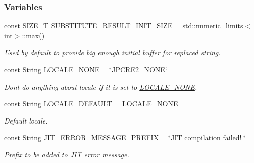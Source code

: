 \subsubsection*{Variables}
\begin{DoxyCompactItemize}
\item 
const \hyperlink{namespacejpcre2_a2aac465ddcb123560c7c8215dd69246c}{S\+I\+Z\+E\+\_\+T} \hyperlink{namespacejpcre2_a80cb201f2e733137b22a8ed98465096a}{S\+U\+B\+S\+T\+I\+T\+U\+T\+E\+\_\+\+R\+E\+S\+U\+L\+T\+\_\+\+I\+N\+I\+T\+\_\+\+S\+I\+ZE} = std\+::numeric\+\_\+limits$<$int$>$\+::max()
\begin{DoxyCompactList}\small\item\em Used by default to provide big enough initial buffer for replaced string. \end{DoxyCompactList}\item 
const \hyperlink{namespacejpcre2_a91f03070152fb228bc116c5a737f1d16}{String} \hyperlink{namespacejpcre2_ad2236dcdcc14d580724b256ce7f168e5}{L\+O\+C\+A\+L\+E\+\_\+\+N\+O\+NE} = \char`\"{}J\+P\+C\+R\+E2\+\_\+\+N\+O\+NE\char`\"{}
\begin{DoxyCompactList}\small\item\em Don\textquotesingle{}t do anything about locale if it is set to \hyperlink{namespacejpcre2_ad2236dcdcc14d580724b256ce7f168e5}{L\+O\+C\+A\+L\+E\+\_\+\+N\+O\+NE}. \end{DoxyCompactList}\item 
const \hyperlink{namespacejpcre2_a91f03070152fb228bc116c5a737f1d16}{String} \hyperlink{namespacejpcre2_adfdd3d1fff99e685734ae4e59771e84d}{L\+O\+C\+A\+L\+E\+\_\+\+D\+E\+F\+A\+U\+LT} = \hyperlink{namespacejpcre2_ad2236dcdcc14d580724b256ce7f168e5}{L\+O\+C\+A\+L\+E\+\_\+\+N\+O\+NE}
\begin{DoxyCompactList}\small\item\em Default locale. \end{DoxyCompactList}\item 
const \hyperlink{namespacejpcre2_a91f03070152fb228bc116c5a737f1d16}{String} \hyperlink{namespacejpcre2_abf6c3bff9268a572c299958d334ff26e}{J\+I\+T\+\_\+\+E\+R\+R\+O\+R\+\_\+\+M\+E\+S\+S\+A\+G\+E\+\_\+\+P\+R\+E\+F\+IX} = \char`\"{}J\+IT compilation failed! \char`\"{}\hypertarget{namespacejpcre2_abf6c3bff9268a572c299958d334ff26e}{}\label{namespacejpcre2_abf6c3bff9268a572c299958d334ff26e}

\begin{DoxyCompactList}\small\item\em Prefix to be added to J\+IT error message. \end{DoxyCompactList}\end{DoxyCompactItemize}


